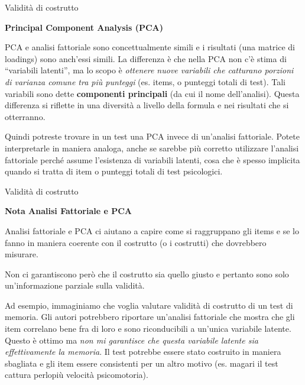 \documentclass[
  ignorenonframetext,
  aspectratio=169,
]{beamer}
\begin{document}
\begin{frame}{Validità di costrutto}
\label{validituxe0-di-costrutto-13}
\begin{center}
  \textbf{Principal Component Analysis (PCA)}
\end{center}

\small

PCA e analisi fattoriale sono concettualmente simili e i risultati (una
matrice di loadings) sono anch'essi simili. La differenza è che nella
PCA non c'è stima di ``variabili latenti'', ma lo scopo è \emph{ottenere
nuove variabili che catturano porzioni di varianza comune tra più
punteggi} (es. items, o punteggi totali di test). Tali variabili sono
dette \textbf{componenti principali} (da cui il nome dell'analisi).
Questa differenza si riflette in una diversità a livello della formula e
nei risultati che si otterranno.

Quindi potreste trovare in un test una PCA invece di un'analisi
fattoriale. Potete interpretarle in maniera analoga, anche se sarebbe
più corretto utilizzare l'analisi fattoriale perché assume l'esistenza
di variabili latenti, cosa che è spesso implicita quando si tratta di
item o punteggi totali di test psicologici.
\end{frame}

\begin{frame}{Validità di costrutto}
\label{validituxe0-di-costrutto-14}
\begin{center}
  \textbf{Nota Analisi Fattoriale e PCA}
\end{center}

\small

Analisi fattoriale e PCA ci aiutano a capire come si raggruppano gli
items e se lo fanno in maniera coerente con il costrutto (o i costrutti)
che dovrebbero misurare.

Non ci garantiscono però che il costrutto sia quello giusto e pertanto
sono solo un'informazione parziale sulla validità.

Ad esempio, immaginiamo che voglia valutare validità di costrutto di un
test di memoria. Gli autori potrebbero riportare un'analisi fattoriale
che mostra che gli item correlano bene fra di loro e sono riconducibili
a un'unica variabile latente. Questo è ottimo ma \emph{non mi garantisce
che questa variabile latente sia effettivamente la memoria}. Il test
potrebbe essere stato costruito in maniera sbagliata e gli item essere
consistenti per un altro motivo (es. magari il test cattura perlopiù
velocità psicomotoria).
\end{frame}
\end{document}
